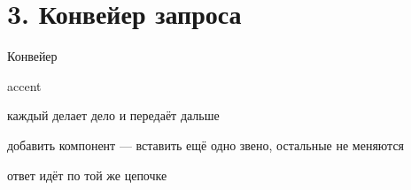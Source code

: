 \documentclass[aspectratio=169,10pt,t]{beamer}
\begin{document}
\section{3. Конвейер запроса}

\newcommand{\chainboxes}{%
  \foreach \i/\t in {1/ошибки,2/логирование,3/маршрутизация,4/аутентификация,
                     5/авторизация} {
    \node[box,minimum width=1.95cm,minimum height=1.0cm,inner sep=1pt,font=\scriptsize]
      (m\i) at ({(\i-1)*2.32},0) {\t};
  }
  \node[box,draw=accent,line width=1.0pt,minimum width=1.95cm,minimum height=1.0cm,
        inner sep=1pt,font=\scriptsize\bfseries] (m6) at (11.6,0) {обработчик};
}

\begin{frame}[plain]
\end{frame}

\begin{frame}{Конвейер}
  \slidetop

  \begin{center}
  \end{center}

  \slidegap
  \begin{cbul}{accent}
    \item каждый делает  дело и передаёт дальше
    \item добавить компонент --- вставить ещё одно звено, остальные не меняются
    \item ответ идёт по той же цепочке 
  \end{cbul}
\end{frame}
\end{document}
